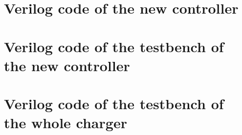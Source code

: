 \documentclass[12pt]{article}
\begin{document}




\newpage
\appendix
\section{Verilog code of the new controller}


\newpage
\section{Verilog code of the testbench of the new controller}


\newpage
\section{Verilog code of the testbench of the whole charger}


\end{document}
